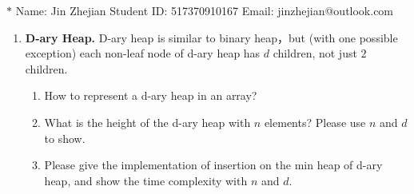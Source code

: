 \documentclass[12pt,a4paper]{article}
\theoremstyle{definition}
\begin{document}
\noindent

\noindent{}
\begin{center}
\footnotesize{\color{blue}$*$ Name: Jin Zhejian  \quad Student ID: 517370910167 \quad Email: jinzhejian@outlook.com}
\end{center}


\begin{enumerate}

\item \textbf{D-ary Heap.} D-ary heap is similar to binary heap，but (with one possible exception) each non-leaf node of d-ary heap has $d$ children, not just $2$ children.

\begin{enumerate}
\item How to represent a d-ary heap in an array?
\item What is the height of the d-ary heap with $n$ elements? Please use $n$ and $d$ to show.
\item Please give the implementation of insertion on the min heap of d-ary heap, and show the time complexity with $n$ and $d$.
\end{enumerate}


\end{enumerate}
\end{document}
